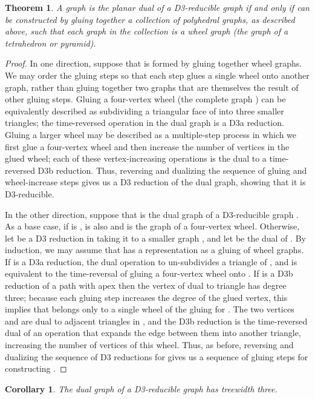 \documentclass{article}
\newtheorem{theorem}{Theorem}
\newtheorem{corollary}{Corollary}
\begin{document}
\begin{theorem}
\label{thm:glue}
A graph  is the planar dual of a D3-reducible graph if and only if  can be constructed by gluing together a collection of polyhedral graphs, as described above, such that each graph in the collection is a wheel graph (the graph of a tetrahedron or pyramid).
\end{theorem}

\begin{proof}
In one direction, suppose that  is formed by gluing together wheel graphs. We may order the gluing steps so that each step glues a single wheel onto another graph, rather than gluing together two graphs that are themselves the result of other gluing steps. Gluing a four-vertex wheel (the complete graph ) can be equivalently described as subdividing a triangular face of  into three smaller triangles; the time-reversed operation in the dual graph is a D3a reduction. Gluing a larger wheel may be described as a multiple-step process in which we first glue a four-vertex wheel and then increase the number of vertices in the glued wheel; each of these vertex-increasing operations is the dual to a time-reversed D3b reduction. Thus, reversing and dualizing the sequence of gluing and wheel-increase steps gives us a D3 reduction of the dual graph, showing that it is D3-reducible.

In the other direction, suppose that  is the dual graph of a D3-reducible graph . As a base case, if  is ,  is also  and is the graph of a four-vertex wheel. Otherwise, let  be a D3 reduction in  taking it to a smaller graph , and let  be the dual of . By induction, we may assume that  has a representation as a gluing of wheel graphs. If  is a D3a reduction, the dual operation to  un-subdivides a triangle of , and is equivalent to the time-reversal of gluing a four-vertex wheel onto . If  is a D3b reduction of a path  with apex  then the vertex  of  dual to triangle  has degree three; because each gluing step increases the degree of the glued vertex, this implies that  belongs only to a single wheel of the gluing for . The two vertices  and  are dual to adjacent triangles in , and the D3b reduction is the time-reversed dual of an operation that expands the edge between them into another triangle, increasing the number of vertices of this wheel. Thus, as before, reversing and dualizing the sequence of D3 reductions for  gives us a sequence of gluing steps for constructing .
\end{proof}

\begin{corollary}
The dual graph of a D3-reducible graph has treewidth three.
\end{corollary}
\end{document}
